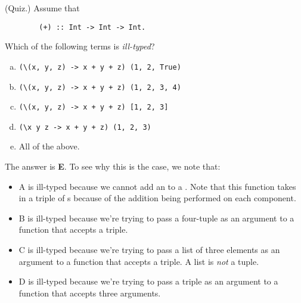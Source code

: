 \documentclass[letterpaper]{article}
\begin{document}
\begin{mdframed}[]
    (Quiz.) Assume that 
    \begin{verbatim}
        (+) :: Int -> Int -> Int.\end{verbatim}
    Which of the following terms is \emph{ill-typed}?
    
    \begin{enumerate}[(a)]
        \item \begin{verbatim}
(\(x, y, z) -> x + y + z) (1, 2, True)\end{verbatim}
        \item \begin{verbatim}
(\(x, y, z) -> x + y + z) (1, 2, 3, 4)\end{verbatim}
        \item \begin{verbatim}
(\(x, y, z) -> x + y + z) [1, 2, 3]\end{verbatim}
        \item \begin{verbatim}
(\x y z -> x + y + z) (1, 2, 3)\end{verbatim}
        \item All of the above. 
    \end{enumerate}

    \begin{mdframed}[]
        The answer is \textbf{E}. To see why this is the case, we note that: 
        \begin{itemize}
            \item A is ill-typed because we cannot add an  to a . Note that this function takes in a triple of s because of the addition being performed on each component.
            \item B is ill-typed because we're trying to pass a four-tuple as an argument to a function that accepts a triple.
            \item C is ill-typed because we're trying to pass a list of three elements as an argument to a function that accepts a triple. A list is \emph{not} a tuple. 
            \item D is ill-typed because we're trying to pass a triple as an argument to a function that accepts three arguments.
        \end{itemize}
    \end{mdframed}
\end{mdframed}
\end{document}
